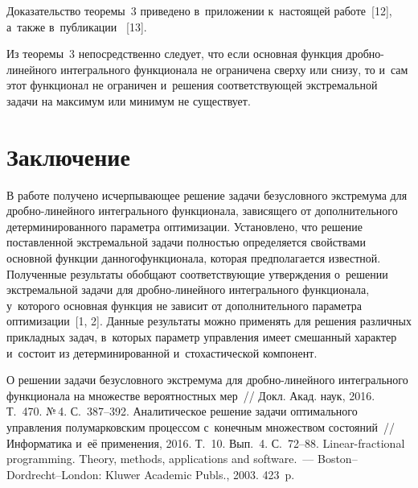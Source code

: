 \begin{multicols}{2}
     \smallskip
     
     Доказательство тео\-ре\-мы~3 приведено в~приложении к~на\-сто\-ящей 
работе~[12], а~так\-же  
в~пуб\-ли\-ка\-ции~ [13].
     
     \smallskip
     
     Из теоремы~3 непосредственно следует, что если основная функция 
дроб\-но-ли\-ней\-но\-го интегрального функционала не ограничена сверху или 
снизу, то и~сам этот функционал не ограничен и~решения соответствующей 
экстремальной задачи на максимум или минимум не существует.

\section{Заключение}

     В работе получено исчерпывающее решение задачи безуслов\-но\-го 
экстремума для  
дроб\-но-ли\-ней\-но\-го интегрального функционала, зависящего от 
дополнительного детерминированного па\-ра\-мет\-ра\linebreak
 оптимизации. Установлено, 
что решение по\-став\-лен\-ной экстремальной задачи пол\-ностью опреде\-ляется 
свойствами основной функции данного\linebreak функционала, которая предполагается 
известной. Полученные результаты обобщают со\-от\-вет\-ст\-ву\-ющие утверж\-де\-ния 
о~решении экстремальной задачи для дроб\-но-ли\-ней\-но\-го интегрального 
функционала, у~которого основная функция не зависит от дополнительного 
па\-ра\-мет\-ра оптимизации~[1, 2]. Данные результаты можно применять для 
решения различных прикладных задач, в~которых параметр управ\-ле\-ния имеет 
смешанный характер и~состоит из детерминированной и~стохастической 
компонент.
     
{\small\frenchspacing
 {%
 \begin{thebibliography}{99}
    
   О решении задачи безусловного экстремума для дробно-линейного 
интегрального функционала на множестве вероятностных мер~// Докл. Акад. наук, 2016. 
Т.~470. №\,4. С.~387--392.
   Аналитическое решение задачи 
оптимального управления полумарковским процессом с~конечным множеством 
состояний~// Информатика и~её применения, 2016. Т.~10. Вып.~4. С.~72--88.
   Linear-fractional programming. Theory, methods, applications and 
software.~--- Boston--Dordrecht--London: Kluwer Academic Publs., 2003. 423~p.
  

\end{thebibliography}}}
\end{multicols}
